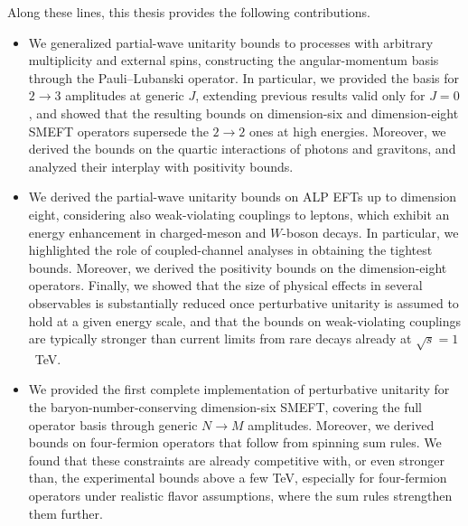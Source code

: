 Along these
lines, this thesis provides the following contributions.
\begin{itemize}
    \item We generalized partial-wave unitarity bounds to processes with arbitrary multiplicity and
    external spins, constructing the angular-momentum basis through the Pauli--Lubanski operator. In
    particular, we provided the basis for $2\to3$ amplitudes at generic $J$, extending previous
    results valid only for $J=0$, and showed that the resulting bounds on dimension-six and
    dimension-eight SMEFT operators supersede the $2\to2$ ones at high energies. Moreover, we
    derived the bounds on the quartic interactions of photons and gravitons, and analyzed their interplay with positivity bounds.

    \item We derived the partial-wave unitarity bounds on ALP EFTs up to dimension eight, considering also
    weak-violating couplings to leptons, which exhibit an energy enhancement in charged-meson and
    $W$-boson decays. In particular, we highlighted the role of coupled-channel analyses in obtaining the
    tightest bounds. Moreover, we derived the positivity bounds on the dimension-eight operators. Finally, we showed that the size of
    physical effects in several observables is substantially reduced once perturbative unitarity is
    assumed to hold at a given energy scale, and that the bounds on weak-violating couplings are
    typically stronger than current limits from rare decays already at $\sqrt s=1$~TeV.

    \item We provided the first complete implementation of perturbative unitarity
    for the baryon-number-conserving dimension-six SMEFT, covering the full operator basis through
    generic $N\to M$ amplitudes. Moreover, we derived bounds on four-fermion operators that follow from spinning sum rules. We found that these
    constraints are already competitive with, or even stronger than, the experimental bounds above a
    few TeV, especially for four-fermion operators under realistic flavor assumptions, where the sum rules strengthen them further.
\end{itemize}



